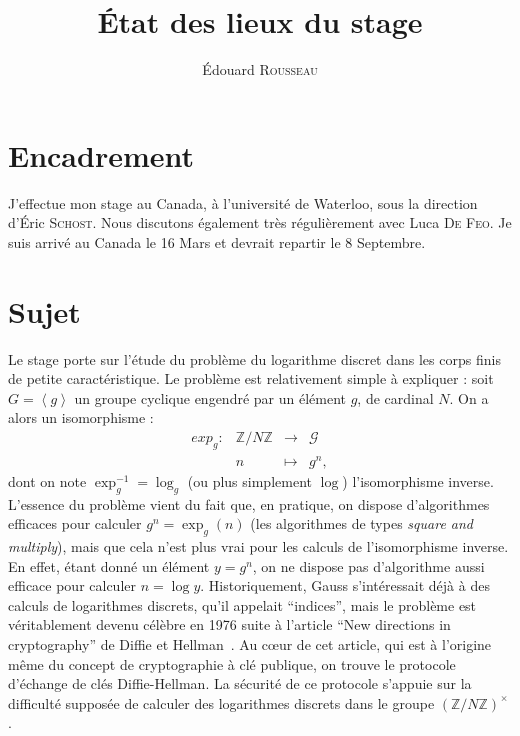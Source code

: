 \documentclass[a4paper,11pt]{article}
\title{État des lieux du stage}
\author{Édouard \textsc{Rousseau}}
\theoremstyle{break}
\theoremstyle{sc}
\theoremstyle{definition}
\theoremstyle{remark}
\begin{document}
\maketitle





\section{Encadrement}

J'effectue mon stage au Canada, à l'université de Waterloo, sous la direction
d'Éric \textsc{Schost}. Nous discutons également très régulièrement avec Luca
\textsc{De Feo}. Je suis arrivé au Canada le 16 Mars et devrait repartir le 8
Septembre.

\section{Sujet}

Le stage porte sur l'étude du problème du logarithme discret dans les corps
finis de petite caractéristique. Le problème est relativement simple à
expliquer : soit $G=\left\langle g\right\rangle$ un groupe cyclique engendré par
un élément $g$, de cardinal $N$. On a alors un isomorphisme :
\[
   \begin{array}{cccc}
        exp_g: & \mathbb{Z}/N\mathbb{Z} & \to & \mathcal G \\
        & n & \mapsto & g^n,
   \end{array}
\]
dont on note $\exp_g^{-1}=\log_g$ (ou plus simplement $\log$) l'isomorphisme
inverse. L'essence du problème vient du fait que, en pratique, on dispose
d'algorithmes efficaces pour calculer $g^n=\exp_g(n)$ (les algorithmes de types
\emph{square and multiply}), mais que cela n'est plus vrai pour les calculs de
l'isomorphisme inverse. En effet, étant donné un élément $y=g^n$, on ne dispose
pas d'algorithme aussi efficace pour calculer $n = \log y$.
Historiquement, Gauss s'intéressait déjà à des
calculs de logarithmes discrets, qu'il appelait ``indices'', mais le problème
est véritablement devenu célèbre en 1976 suite à l'article ``New directions in
cryptography'' de Diffie et Hellman~\cite{DH76}. Au cœur de cet article, qui 
est à l'origine même du concept de cryptographie à clé publique, on trouve le 
protocole d'échange de clés Diffie-Hellman. La sécurité de ce protocole 
s'appuie sur la difficulté supposée de calculer des logarithmes discrets dans le
groupe $(\mathbb{Z}/N\mathbb{Z})^\times$. 



\end{document}
